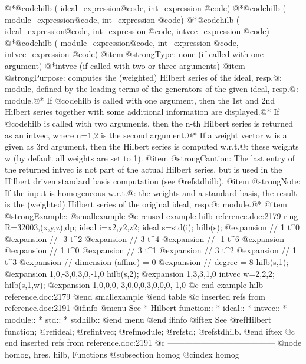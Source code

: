 {@*@code{hilb (} ideal_expression@code{,} int_expression @code{)}
@*@code{hilb (} module_expression@code{,} int_expression @code{)}
@*@code{hilb (} ideal_expression@code{,} int_expression @code{,} intvec_expression @code{)}
@*@code{hilb (} module_expression@code{,} int_expression @code{,} intvec_expression @code{)}
@item @strong{Type:}
none (if called with one argument)
@*intvec (if called with two or three arguments)
@item @strong{Purpose:}
computes the (weighted) Hilbert series of the ideal, resp.@: module,
defined by the leading terms of the generators of the given ideal, resp.@: module.@*
If @code{hilb} is called with one argument, then the 1st and 2nd Hilbert series
together with some additional information are displayed.@*
If @code{hilb} is called with two arguments, then the n-th Hilbert series is returned
as an intvec, where n=1,2 is the second argument.@*
If a weight vector w is a given as 3rd argument, then the Hilbert series is computed
w.r.t.@: these weights w (by default all weights are set to 1).
@item @strong{Caution:}
The last entry of the returned intvec is not part of the actual Hilbert series,
but is used in the Hilbert driven standard basis computation (see @ref{stdhilb}).
@item @strong{Note:}
If the input is homogeneous w.r.t.@: the weights and a standard basis, the result is
the (weighted) Hilbert series of the original ideal, resp.@: module.@*
@item @strong{Example:}
@smallexample
@c reused example hilb reference.doc:2179 
  ring R=32003,(x,y,z),dp;
  ideal i=x2,y2,z2;
  ideal s=std(i);
  hilb(s);
@expansion{} //         1 t^0
@expansion{} //        -3 t^2
@expansion{} //         3 t^4
@expansion{} //        -1 t^6
@expansion{} 
@expansion{} //         1 t^0
@expansion{} //         3 t^1
@expansion{} //         3 t^2
@expansion{} //         1 t^3
@expansion{} // dimension (affine)  = 0
@expansion{} // degree      = 8
  hilb(s,1);
@expansion{} 1,0,-3,0,3,0,-1,0
  hilb(s,2);
@expansion{} 1,3,3,1,0
  intvec w=2,2,2;
  hilb(s,1,w);
@expansion{} 1,0,0,0,-3,0,0,0,3,0,0,0,-1,0
@c end example hilb reference.doc:2179
@end smallexample
@end table
@c inserted refs from reference.doc:2191
@ifinfo
@menu
See
* Hilbert function::
* ideal::
* intvec::
* module::
* std::
* stdhilb::
@end menu
@end ifinfo
@iftex
See
@ref{Hilbert function};
@ref{ideal};
@ref{intvec};
@ref{module};
@ref{std};
@ref{stdhilb}.
@end iftex
@c end inserted refs from reference.doc:2191
@c ---------------------------------------
@node homog, hres, hilb, Functions
@subsection homog
@cindex homog

}
